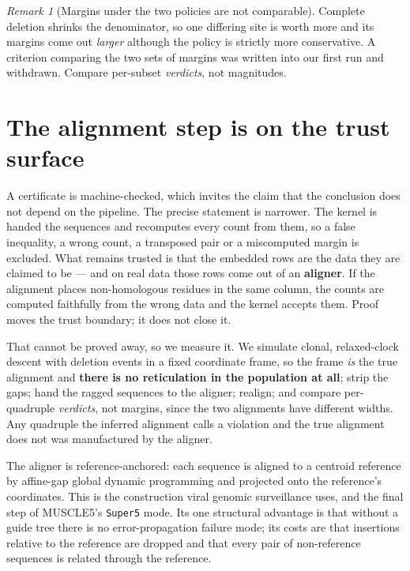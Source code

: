 \documentclass[11pt,a4paper]{article}
\theoremstyle{definition}
\theoremstyle{remark}
\newtheorem{remark}{Remark}[section]
\begin{document}
\begin{remark}[Margins under the two policies are not comparable]
Complete deletion shrinks the denominator, so one differing site is worth more
and its margins come out \emph{larger} although the policy is strictly more
conservative. A criterion comparing the two sets of margins was written into our
first run and withdrawn. Compare per-subset \emph{verdicts}, not magnitudes.
\end{remark}

\section{The alignment step is on the trust surface}\label{sec:aligner}

A certificate is machine-checked, which invites the claim that the conclusion
does not depend on the pipeline. The precise statement is narrower. The kernel is
handed the sequences and recomputes every count from them, so a false
inequality, a wrong count, a transposed pair or a miscomputed margin is excluded.
What remains trusted is that the embedded rows are the data they are claimed to
be --- and on real data those rows come out of an \textbf{aligner}. If the
alignment places non-homologous residues in the same column, the counts are
computed faithfully from the wrong data and the kernel accepts them. Proof moves
the trust boundary; it does not close it.

That cannot be proved away, so we measure it. We simulate clonal, relaxed-clock
descent with deletion events in a fixed coordinate frame, so the frame \emph{is}
the true alignment and \textbf{there is no reticulation in the population at
all}; strip the gaps; hand the ragged sequences to the aligner; realign; and
compare per-quadruple \emph{verdicts}, not margins, since the two alignments
have different widths. Any quadruple the inferred alignment calls a violation
and the true alignment does not was manufactured by the aligner.

The aligner is reference-anchored: each sequence is aligned to a centroid
reference by affine-gap global dynamic programming and projected onto the
reference's coordinates. This is the construction viral genomic surveillance
uses, and the final step of MUSCLE5's \texttt{Super5} mode. Its one structural
advantage is that without a guide tree there is no error-propagation failure
mode; its costs are that insertions relative to the reference are dropped and
that every pair of non-reference sequences is related through the reference.
\end{document}
